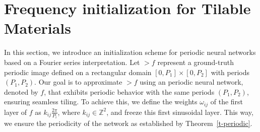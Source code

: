 



\section{Frequency initialization for Tilable Materials}
\label{s-initialization}

In this section, we introduce an initialization scheme for periodic neural networks based on a Fourier series interpretation. Let $\gt{f}$ represent a ground-truth periodic image defined on a rectangular domain $[0, P_1] \times [0, P_2]$ with periods $(P_1, P_2)$. Our goal is to approximate $\gt{f}$ using an periodic neural network, denoted by $f$, that exhibits periodic behavior with the same periods $(P_1, P_2)$, ensuring seamless tiling. To achieve this, we define the weights $\omega_{ij}$ of the first layer of $f$ as $k_{ij}\frac{2\pi}{P_i}$, where $k_{ij}\in \mathbb{Z}^2$, and freeze this first sinusoidal layer. This way, we ensure the periodicity of the network as established by Theorem~\ref{t-periodic}.

